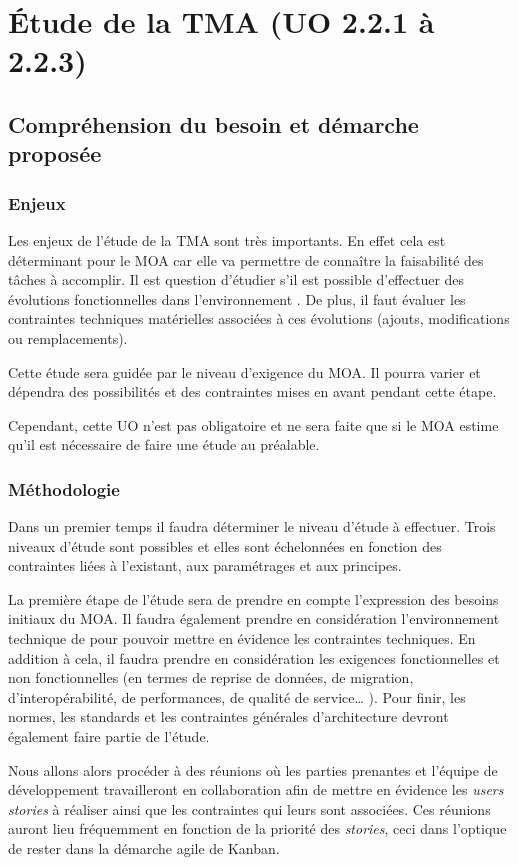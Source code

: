 \section{Étude de la TMA (UO 2.2.1 à 2.2.3)}
	\subsection{Compréhension du besoin et démarche proposée}
	\subsubsection{Enjeux}
	Les enjeux de l’étude de la TMA sont très importants. En effet cela est déterminant pour le MOA car elle va permettre de connaître la faisabilité des tâches à accomplir. Il est question d’étudier s’il est possible d’effectuer des évolutions fonctionnelles dans l’environnement \correlyce{}. De plus, il faut évaluer les contraintes techniques matérielles associées à ces évolutions (ajouts, modifications ou remplacements).
	
	Cette étude sera guidée par le niveau d’exigence du MOA. Il pourra varier et dépendra des possibilités et des contraintes mises en avant pendant cette étape.
	
	Cependant, cette UO n’est pas obligatoire et ne sera faite que si le MOA estime qu’il est nécessaire de faire une étude au préalable.
	
	\subsubsection{Méthodologie}
	Dans un premier temps il faudra déterminer le niveau d’étude à effectuer. Trois niveaux d’étude sont possibles et elles sont échelonnées en fonction des contraintes liées à l’existant, aux paramétrages et aux principes.
	
	La première étape de l’étude sera de prendre en compte l’expression des besoins initiaux du MOA. Il faudra également prendre en considération l’environnement technique de \correlyce{} pour pouvoir mettre en évidence les contraintes techniques. En addition à cela, il faudra prendre en considération les exigences fonctionnelles et non fonctionnelles (en termes de reprise de données, de migration, d'interopérabilité, de performances, de qualité de service… ). Pour finir, les normes, les standards et les contraintes générales d’architecture devront également faire partie de l’étude.
	
	Nous allons alors procéder à des réunions où les parties prenantes et l’équipe de développement travailleront en collaboration afin de mettre en évidence les \textit{users stories} à réaliser ainsi que les contraintes qui leurs sont associées. Ces réunions auront lieu fréquemment en fonction de la priorité des \textit{stories}, ceci dans l’optique de rester dans la démarche agile de Kanban.
	
